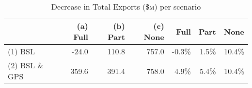 \begin{table}[H]
\centering
\caption{Decrease in Total Exports (\$\textsc{m}) per scenario} 
\begin{tabular}{lrrr|rrr}
  \hline
 &  (a) Full & (b) Part & (c) None & Full & Part & None \\ 
  \hline
(1) BSL & -24.0 & 110.8 & 757.0 & -0.3\% & 1.5\% & 10.4\% \\ 
  (2) BSL \& GPS & 359.6 & 391.4 & 758.0 & 4.9\% & 5.4\% & 10.4\% \\ 
   \hline
\end{tabular}
\end{table}
